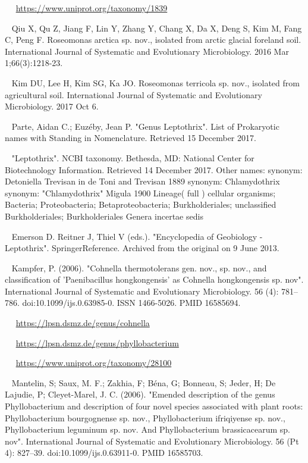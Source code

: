 \documentclass[11pt]{article}
\begin{document}
\begin{thebibliography}{3}
	~ ~\url{https://www.uniprot.org/taxonomy/1839}

	~
	Qiu X, Qu Z, Jiang F, Lin Y, Zhang Y, Chang X, Da X, Deng S, Kim M, Fang C, Peng F. Roseomonas arctica sp. nov., isolated from arctic glacial foreland soil. International Journal of Systematic and Evolutionary Microbiology. 2016 Mar 1;66(3):1218-23.
	
	~
	Kim DU, Lee H, Kim SG, Ka JO. Roseomonas terricola sp. nov., isolated from agricultural soil. International Journal of Systematic and Evolutionary Microbiology. 2017 Oct 6.

	~ Parte, Aidan C.; Euzéby, Jean P. "Genus Leptothrix". List of Prokaryotic names with Standing in Nomenclature. Retrieved 15 December 2017.
	
	~ "Leptothrix". NCBI taxonomy. Bethesda, MD: National Center for Biotechnology Information. Retrieved 14 December 2017. Other names: synonym: Detoniella Trevisan in de Toni and Trevisan 1889 synonym: Chlamydothrix synonym: "Chlamydothrix" Migula 1900 Lineage( full ) cellular organisms; Bacteria; Proteobacteria; Betaproteobacteria; Burkholderiales; unclassified Burkholderiales; Burkholderiales Genera incertae sedis
	
	~ Emerson D. Reitner J, Thiel V (eds.). "Encyclopedia of Geobiology - Leptothrix". SpringerReference. Archived from the original on 9 June 2013.
	
	~ Kampfer, P. (2006). "Cohnella thermotolerans gen. nov., sp. nov., and classification of 'Paenibacillus hongkongensis' as Cohnella hongkongensis sp. nov". International Journal of Systematic and Evolutionary Microbiology. 56 (4): 781–786. doi:10.1099/ijs.0.63985-0. ISSN 1466-5026. PMID 16585694.
	
	~ ~\url{https://lpsn.dsmz.de/genus/cohnella}

	~ ~\url{https://lpsn.dsmz.de/genus/phyllobacterium}

	~ ~\url{https://www.uniprot.org/taxonomy/28100}	

	~ Mantelin, S; Saux, M. F.; Zakhia, F; Béna, G; Bonneau, S; Jeder, H; De Lajudie, P; Cleyet-Marel, J. C. (2006). "Emended description of the genus Phyllobacterium and description of four novel species associated with plant roots: Phyllobacterium bourgognense sp. nov., Phyllobacterium ifriqiyense sp. nov., Phyllobacterium leguminum sp. nov. And Phyllobacterium brassicacearum sp. nov". International Journal of Systematic and Evolutionary Microbiology. 56 (Pt 4): 827–39. doi:10.1099/ijs.0.63911-0. PMID 16585703.
 

\end{thebibliography}
\end{document}

